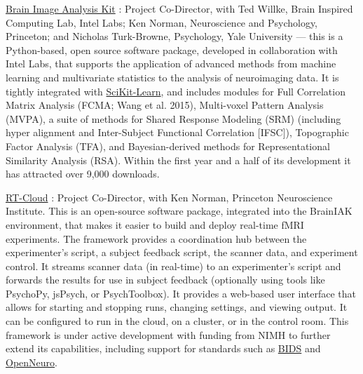 \documentclass[10 pt]{article}
\begin{document}
\href{http://BrainIAK.org}{Brain Image Analysis Kit} \cite{kumar2021brainiak}: Project Co-Director, with Ted Willke, Brain Inspired Computing Lab, Intel Labs; Ken Norman, Neuroscience and Psychology, Princeton; and Nicholas Turk-Browne, Psychology, Yale University — this is a Python-based, open source software package, developed in collaboration with Intel Labs, that supports the application of advanced methods from machine learning and multivariate statistics to the analysis of neuroimaging data. It is tightly integrated with \href{http://scikit-learn.org/}{SciKit-Learn}, and includes modules for Full Correlation Matrix Analysis (FCMA; Wang et al. 2015), Multi-voxel Pattern Analysis (MVPA), a suite of methods for Shared Response Modeling (SRM) (including hyper alignment and Inter-Subject Functional Correlation [IFSC]), Topographic Factor Analysis (TFA), and Bayesian-derived methods for Representational Similarity Analysis (RSA). Within the first year and a half of its development it has attracted over 9,000 downloads.
    \smallskip

\href{https://github.com/brainiak/rt-cloud}{RT-Cloud} \cite{wallace2022rt-cloud}: Project Co-Director, with Ken
Norman, Princeton Neuroscience Institute. This is an open-source software package, integrated into the BrainIAK environment, that makes it easier to build and deploy real-time fMRI experiments. The framework provides a coordination hub between the experimenter’s script, a subject feedback script, the scanner data, and experiment control. It streams scanner data (in real-time) to an experimenter’s script and forwards the results for use in subject feedback (optionally using tools like PsychoPy, jsPsych, or PsychToolbox). It provides a web-based user interface that allows for starting and stopping runs, changing settings, and viewing output. It can be configured to run in the cloud, on a cluster, or in the control room. This framework is under active development with funding from NIMH to further extend its capabilities, including support for standards such as \href{https://bids.neuroimaging.io}{BIDS} and \href{https://openneuro.org}{OpenNeuro}.
    \smallskip
\end{document}
